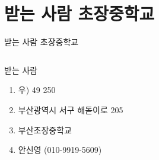 \documentclass[aspectratio=1610,12pt,xcolor=pdftex,dvipsnames,table,handout]{beamer}
\begin{document}
%
%
%

		\section{받는 사람 초장중학교}
		\begin{frame}[c,plain]{받는 사람 초장중학교}

		\begin{columns}[t]
		\begin{column}{1.0\textwidth}

			\begin{block} {받는 사람}
			\begin{enumerate}
			\item [] 우) 49 250
			\item [] 부산광역시 서구 해돋이로 205
			\item [] 부산초장중학교 
			\item [] 안신영 (010-9919-5609)
			\end{enumerate}
			\end{block}
		\end{column}
		\end{columns}

		\end{frame}
\end{document}
